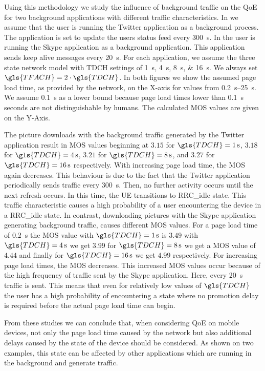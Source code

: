 Using this methodology we study the influence of background traffic on the \gls{QoE} for two background applications with different traffic characteristics.
In  we assume that the user is running the Twitter application as a background process.
The application is set to update the users status feed every \SI{300}{\second}.
In  the user is running the Skype application as a background application.
This application sends keep alive messages every \SI{20}{\second}.
For each application, we assume the three state network model with \gls{TDCH} settings of \SIlist{1;4;8;16}{\second}.
We always set \(\gls{TFACH} = 2\cdot \gls{TDCH}\).
In both figures we show the assumed page load time, as provided by the network, on the X-axis for values from \SIrange{0.2}{25}{\second}.
We assume \SI{0.1}{\second} as a lower bound because page load times lower than \SI{0.1}{\second} seconds are not distinguishable \cite{egger2012b} by humans.
The calculated \gls{MOS} values are given on the Y-Axis.

The picture downloads with the background traffic generated by the Twitter application result in \gls{MOS} values beginning at \(3.15\) for \(\gls{TDCH} = \SI{1}{\second}\), \(3.18\) for \(\gls{TDCH} = \SI{4}{\second}\), \(3.21\) for \(\gls{TDCH} = \SI{8}{\second}\), and \(3.27\) for \(\gls{TDCH} = \SI{16}{\second}\) respectively.
With increasing page load time, the \gls{MOS} again decreases.
This behaviour is due to the fact that the Twitter application periodically sends traffic every \SI{300}{\second}.
Then, no further activity occurs until the next refresh occurs.
In this time, the \gls{UE} transitions to \gls{RRC_idle} state.
This traffic characteristic causes a high probability of a user encountering the device in a \gls{RRC_idle} state.
In contrast, downloading pictures with the Skype application generating background traffic, causes different \gls{MOS} values.
For a page load time of \SI{0.2}{\second} the \gls{MOS} value with \(\gls{TDCH} = \SI{1}{\second}\) is \(3.49\) with \(\gls{TDCH} = \SI{4}{\second}\) we get \(3.99\) for \(\gls{TDCH} = \SI{8}{\second}\) we get a \gls{MOS} value of \(4.44\) and finally for \(\gls{TDCH} = \SI{16}{\second}\) we get \(4.99\) respectively.
For increasing page load times, the \gls{MOS} decreases.
This increased \gls{MOS} values occur because of the high frequency of traffic sent by the Skype application.
Here, every \SI{20}{\second} traffic is sent.
This means that even for relatively low values of \(\gls{TDCH}\) the user has a high probability of encountering a state where no promotion delay is required before the actual page load time can begin.

From these studies we can conclude that, when considering \gls{QoE} on mobile devices, not only the page load time caused by the network but also additional delays caused by the state of the device should be considered.
As shown on two examples, this state can be affected by other applications which are running in the background and generate traffic.


